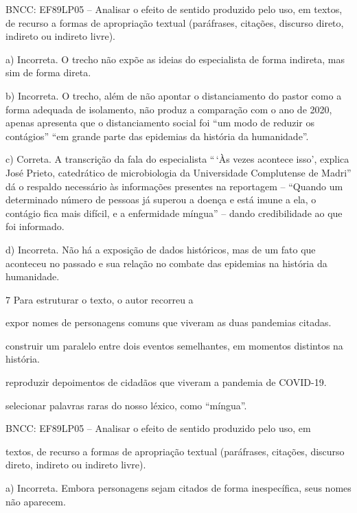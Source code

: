BNCC: EF89LP05 -- Analisar o efeito de sentido produzido pelo uso, em
textos, de recurso a formas de apropriação textual (paráfrases,
citações, discurso direto, indireto ou indireto livre).

a) Incorreta. O trecho não expõe as ideias do especialista de forma
indireta, mas sim de forma direta.

b) Incorreta. O trecho, além de não apontar o distanciamento do pastor
como a forma adequada de isolamento, não produz a comparação com o ano
de 2020, apenas apresenta que o distanciamento social foi ``um modo de
reduzir os contágios'' ``em grande parte das epidemias da história da
humanidade''.

c) Correta. A transcrição da fala do especialista ``\,`Às vezes acontece
isso', explica José Prieto, catedrático de microbiologia da Universidade
Complutense de Madri'' dá o respaldo necessário às informações presentes
na reportagem -- ``Quando um determinado número de pessoas já superou a
doença e está imune a ela, o contágio fica mais difícil, e a enfermidade
míngua'' -- dando credibilidade ao que foi informado.

d) Incorreta. Não há a exposição de dados históricos, mas de um fato que
aconteceu no passado e sua relação no combate das epidemias na história
da humanidade.

\num{7} Para estruturar o texto, o autor recorreu a

\begin{escolha}
\item expor nomes de personagens comuns que viveram as duas pandemias
citadas.

\item construir um paralelo entre dois eventos semelhantes, em momentos
distintos na história.

\item reproduzir depoimentos de cidadãos que viveram a pandemia de
COVID-19.

\item selecionar palavras raras do nosso léxico, como ``míngua''.

\end{escolha}BNCC: EF89LP05 -- Analisar o efeito de sentido produzido pelo uso, em

textos, de recurso a formas de apropriação textual (paráfrases,
citações, discurso direto, indireto ou indireto livre).

a) Incorreta. Embora personagens sejam citados de forma inespecífica,
seus nomes não aparecem.

